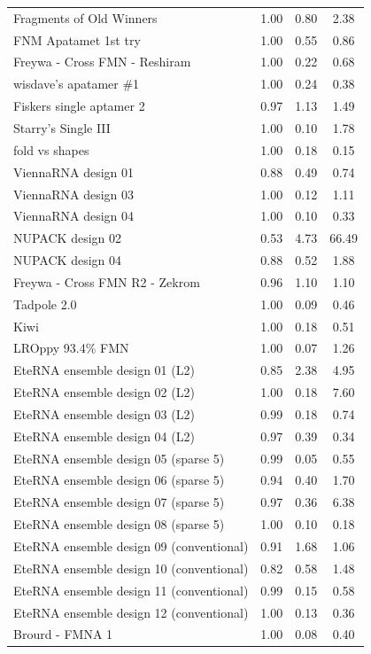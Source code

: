 \documentclass[letter]{bioinfo}
\begin{document}
\begin{center}
\begin{longtable}{l ccc}
Fragments of Old Winners		&1.00	&0.80	&2.38 \\
FNM Apatamet 1st try			&1.00 	&0.55 	&0.86 \\
Freywa - Cross FMN - Reshiram	&1.00 	&0.22 	&0.68 \\
wisdave's apatamer \#1			&1.00 	&0.24 	&0.38 \\
Fiskers single aptamer 2		&0.97 	&1.13 	&1.49 \\
Starry's Single III			&1.00 	&0.10 	&1.78 \\
fold vs shapes				&1.00 	&0.18 	&0.15 \\
ViennaRNA design 01			&0.88 	&0.49 	&0.74 \\
ViennaRNA design 03			&1.00 	&0.12 	&1.11 \\
ViennaRNA design 04			&1.00 	&0.10 	&0.33 \\
NUPACK design 02				&0.53 	&4.73 	&66.49 \\
NUPACK design 04				&0.88 	&0.52 	&1.88 \\
Freywa - Cross FMN R2 - Zekrom	&0.96 	&1.10 	&1.10 \\
Tadpole 2.0					&1.00 	&0.09 	&0.46 \\
Kiwi							&1.00 	&0.18 	&0.51 \\
LROppy 93.4\% FMN				&1.00 	&0.07 	&1.26 \\
EteRNA ensemble design 01 (L2)	&0.85 	&2.38 	&4.95 \\
EteRNA ensemble design 02 (L2)	&1.00 	&0.18 	&7.60 \\
EteRNA ensemble design 03 (L2)	&0.99 	&0.18 	&0.74 \\
EteRNA ensemble design 04 (L2)	&0.97 	&0.39 	&0.34 \\
EteRNA ensemble design 05 (sparse 5)		&0.99 	&0.05 	&0.55 \\
EteRNA ensemble design 06 (sparse 5)		&0.94 	&0.40 	&1.70 \\
EteRNA ensemble design 07 (sparse 5)		&0.97 	&0.36 	&6.38 \\
EteRNA ensemble design 08 (sparse 5)		&1.00 	&0.10 	&0.18 \\
EteRNA ensemble design 09 (conventional)		&0.91 	&1.68 	&1.06 \\
EteRNA ensemble design 10 (conventional)		&0.82 	&0.58 	&1.48 \\
EteRNA ensemble design 11 (conventional)		&0.99 	&0.15 	&0.58 \\
EteRNA ensemble design 12 (conventional)		&1.00 	&0.13 	&0.36 \\
Brourd - FMNA 1			&1.00 	&0.08 	&0.40 \\

\end{longtable}
\end{center}
\end{document}
